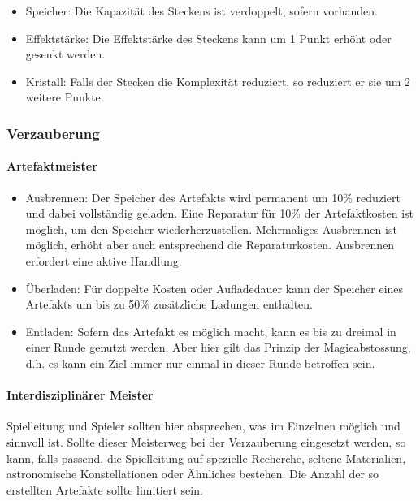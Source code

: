 \documentclass{article}
\begin{document}
\begin{itemize}
\item Speicher: Die Kapazität des Steckens ist verdoppelt, sofern vorhanden.
\item Effektstärke: Die Effektstärke des Steckens kann um 1 Punkt erhöht oder gesenkt werden.
\item Kristall: Falls der Stecken die Komplexität reduziert, so reduziert er sie um 2 weitere Punkte.
\end{itemize}

\subsubsection{Verzauberung}

\paragraph{Artefaktmeister}

\begin{itemize}
\item Ausbrennen: Der Speicher des Artefakts wird permanent um 10\% reduziert und dabei vollständig geladen. Eine Reparatur für 10\% der Artefaktkosten ist möglich, um den Speicher wiederherzustellen. Mehrmaliges Ausbrennen ist möglich, erhöht aber auch entsprechend die Reparaturkosten. Ausbrennen erfordert eine aktive Handlung.
\item Überladen: Für doppelte Kosten oder Aufladedauer kann der Speicher eines Artefakts um bis zu 50\% zusätzliche Ladungen enthalten.
\item Entladen: Sofern das Artefakt es möglich macht, kann es bis zu dreimal in einer Runde genutzt werden. Aber hier gilt das Prinzip der Magieabstossung, d.h. es kann ein Ziel immer nur einmal in dieser Runde betroffen sein.
\end{itemize}

\paragraph{Interdisziplinärer Meister}

Spielleitung und Spieler sollten hier absprechen, was im Einzelnen möglich und sinnvoll ist. Sollte dieser Meisterweg
bei der Verzauberung eingesetzt werden, so kann, falls passend, die Spielleitung auf spezielle Recherche, seltene
Materialien, astronomische Konstellationen oder Ähnliches bestehen. Die Anzahl der so erstellten Artefakte sollte
limitiert sein.
\end{document}
